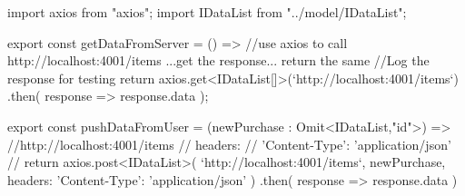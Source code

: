 import axios from "axios";
import IDataList from "../model/IDataList";

export const getDataFromServer = () =>{
    //use axios to call  http://localhost:4001/items ...get the response... return the same
    //Log the response for testing
    return axios.get<IDataList[]>(`http://localhost:4001/items`)
            .then( response => response.data );
}

export const pushDataFromUser = (newPurchase : Omit<IDataList,"id">) => {
    //http://localhost:4001/items
    // headers: {
    //     'Content-Type': 'application/json'
    // }
    return axios.post<IDataList>(
        `http://localhost:4001/items`,
        newPurchase,
        {
            headers: {
                'Content-Type': 'application/json'
            }
        }
    )
    .then( response => response.data )
}
